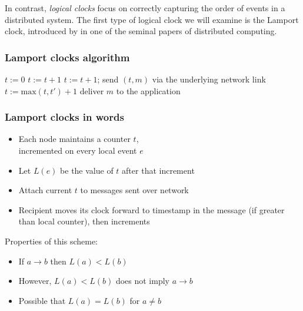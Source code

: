 In contrast, \emph{logical clocks} focus on correctly capturing the order of events in a distributed system.
The first type of logical clock we will examine is the Lamport clock, introduced by \citet{Lamport:1978} in one of the seminal papers of distributed computing.

\begin{frame}
    \label{s:lamport-definition}
    \frametitle{Lamport clocks algorithm}
    \begin{algorithmic}
            \State $t := 0$ 
        \EndOn
        \State
            \State $t := t + 1$
        \EndOn
        \State
            \State $t := t + 1$; send $(t, m)$ via the underlying network link
        \EndOn
        \State
            \State $t := \mathrm{max}(t, t') + 1$
            \State deliver $m$ to the application
        \EndOn
    \end{algorithmic}
\end{frame}
\label{l:lamport-definition}

\begin{frame}
    \label{s:lamport-description}
    \frametitle{Lamport clocks in words}
    \begin{itemize}
        \item Each node maintains a counter $t$,\\incremented on every local event $e$
        \item Let $L(e)$ be the value of $t$ after that increment
        \item Attach current $t$ to messages sent over network
        \item Recipient moves its clock forward to timestamp in the message (if greater than local counter), then increments\\[1em]
    \end{itemize}\pause
    Properties of this scheme:
    \begin{itemize}
        \item If $a \rightarrow b$ then $L(a) < L(b)$\pause
        \item However, $L(a) < L(b)$ does not imply $a \rightarrow b$\pause
        \item Possible that $L(a) = L(b)$ for $a \neq b$
    \end{itemize}
\end{frame}
\label{l:lamport-description}

